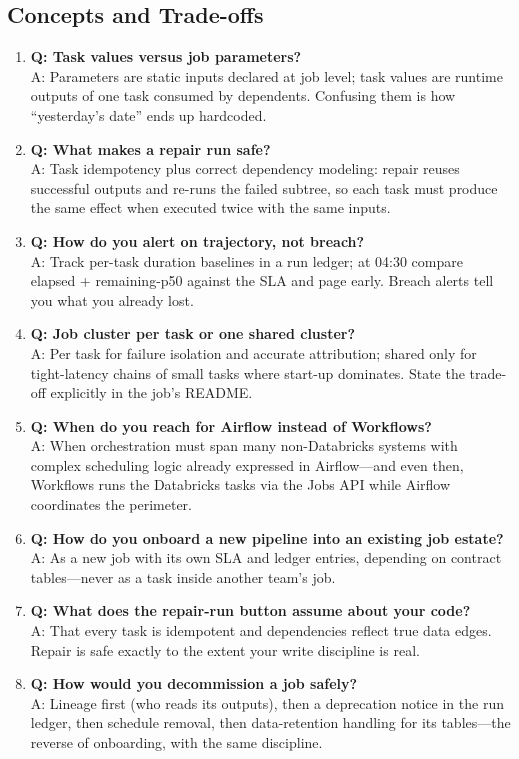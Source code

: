 \subsection{Concepts and Trade-offs}
\begin{enumerate}
    \item \textbf{Q: Task values versus job parameters?}\\
    A: Parameters are static inputs declared at job level; task values are runtime outputs of one task consumed by dependents. Confusing them is how ``yesterday's date'' ends up hardcoded.
    \item \textbf{Q: What makes a repair run safe?}\\
    A: Task idempotency plus correct dependency modeling: repair reuses successful outputs and re-runs the failed subtree, so each task must produce the same effect when executed twice with the same inputs.
    \item \textbf{Q: How do you alert on trajectory, not breach?}\\
    A: Track per-task duration baselines in a run ledger; at 04:30 compare elapsed + remaining-p50 against the SLA and page early. Breach alerts tell you what you already lost.
    \item \textbf{Q: Job cluster per task or one shared cluster?}\\
    A: Per task for failure isolation and accurate attribution; shared only for tight-latency chains of small tasks where start-up dominates. State the trade-off explicitly in the job's README.
    \item \textbf{Q: When do you reach for Airflow instead of Workflows?}\\
    A: When orchestration must span many non-Databricks systems with complex scheduling logic already expressed in Airflow---and even then, Workflows runs the Databricks tasks via the Jobs API while Airflow coordinates the perimeter.
    \item \textbf{Q: How do you onboard a new pipeline into an existing job estate?}\\
    A: As a new job with its own SLA and ledger entries, depending on contract tables---never as a task inside another team's job.
    \item \textbf{Q: What does the repair-run button assume about your code?}\\
    A: That every task is idempotent and dependencies reflect true data edges. Repair is safe exactly to the extent your write discipline is real.
    \item \textbf{Q: How would you decommission a job safely?}\\
    A: Lineage first (who reads its outputs), then a deprecation notice in the run ledger, then schedule removal, then data-retention handling for its tables---the reverse of onboarding, with the same discipline.
\end{enumerate}

